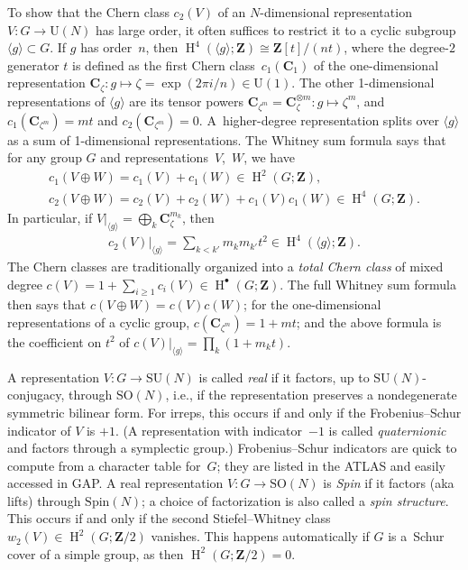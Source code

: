 \documentclass[pdftex]{sigma}
\numberwithin{equation}{section}
\newcommand\bC{\mathbf C}
\newcommand\bZ{\mathbf Z}
\DeclareMathOperator\homology{H}
\renewcommand\H{\homology}
\newcommand\<\langle
\renewcommand\>\rangle
\newcommand\Spin{\mathrm{Spin}}
\newcommand\SU{\mathrm{SU}}
\newcommand\SO{\mathrm{SO}}
\begin{document}
To show that the Chern class $c_2(V)$ of an $N$-dimensional representation $V\colon G \to \mathrm{U}(N)$ has large order, it often suffices to restrict it to a cyclic subgroup $\langle g\rangle \subset G$. If $g$ has order~$n$, then $\H^4(\langle g\rangle;\bZ) \cong \bZ[t]/(nt)$, where the degree-$2$ generator $t$ is defined as the first Chern class~$c_1(\bC_1)$ of the one-dimensional representation $\bC_\zeta\colon g \mapsto \zeta = \exp(2\pi i /n) \in \mathrm{U}(1)$. The other 1-dimensional representations of $\langle g\rangle$ are its tensor powers $\bC_{\zeta^m} = \bC_\zeta^{\otimes m}\colon g \mapsto \zeta^m$, and $c_1(\bC_{\zeta^m}) = mt$ and $c_2(\bC_{\zeta^m}) = 0$. A~higher-degree representation splits over $\langle g\rangle$ as a sum of 1-dimensional representations. The Whitney sum formula says that for any group $G$ and representations~$V$,~$W$, we have
\begin{gather*} c_1(V \oplus W) = c_1(V) + c_1(W) \in \H^2(G;\bZ), \\ c_2(V\oplus W) = c_2(V) + c_2(W) + c_1(V)c_1(W) \in \H^4(G;\bZ).\end{gather*}
In particular, if $V|_{\langle g\rangle} = \bigoplus_k \bC_\zeta^{m_k}$, then
\begin{gather*} c_2(V)|_{\langle g\rangle} = \sum_{k<k'} m_k m_{k'} t^2 \in \H^4(\langle g\rangle;\bZ).\end{gather*}
The Chern classes are traditionally organized into a {\it total Chern class} of mixed degree $c(V) = 1 + \sum\limits_{i\geq 1}c_i(V) \in \H^\bullet(G;\bZ)$. The full Whitney sum formula then says that $c(V \oplus W) = c(V)c(W)$; for the one-dimensional representations of a cyclic group, $c(\bC_{\zeta^m}) = 1+mt$; and the above formula is the coefficient on $t^2$ of $c(V)|_{\langle g\rangle} = \prod_k (1 + m_k t)$.

A representation $V\colon G \to \SU(N)$ is called {\it real} if it factors, up to $\SU(N)$-conjugacy, through $\SO(N)$, i.e., if the representation preserves a nondegenerate symmetric bilinear form. For irreps, this occurs if and only if the Frobenius--Schur indicator of $V$ is $+1$. (A representation with indicator~$-1$ is called {\it quaternionic} and factors through a symplectic group.) Frobenius--Schur indicators are quick to compute from a character table for~$G$; they are listed in the ATLAS and easily accessed in GAP. A real representation $V\colon G \to \SO(N)$ is {\it Spin} if it factors (aka lifts) through $\Spin(N)$; a choice of factorization is also called a {\it spin structure}. This occurs if and only if the second Stiefel--Whitney class $w_2(V) \in \H^2(G; \bZ/2)$ vanishes. This happens automatically if $G$ is a~Schur cover of a simple group, as then $\H^2(G; \bZ/2) = 0$.
\end{document}
